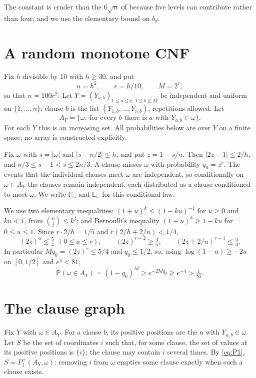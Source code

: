 \documentclass[11pt]{amsart}
\theoremstyle{definition}
\theoremstyle{remark}
\numberwithin{equation}{section}
\newcommand{\Pp}{\mathbb P}
\newcommand{\E}{\mathbb E}
\begin{document}
The constant is cruder than the $6\sqrt n$ of \cite[(53.2)]{C} because five levels can contribute rather than four, and we use the elementary bound on $b_d$.

\section{A random monotone CNF}\label{sec:cnf}

Fix $h$ divisible by $10$ with $h\ge30$, and put
\[
n=h^2,\qquad r=h/10,\qquad M=2^r,
\]
so that $n=100r^2$. Let $Y=(Y_{a,b})_{1\le a\le r,\,1\le b\le M}$ be independent and uniform on $\{1,\dots,n\}$; clause $b$ is the list $(Y_{1,b},\dots,Y_{r,b})$, repetitions allowed. Let
\[
A_Y=\{\omega:\ \text{for every } b \text{ there is } a \text{ with } Y_{a,b}\in\omega\}.
\]
For each $Y$ this is an increasing set. All probabilities below are over $Y$ on a finite space; no array is constructed explicitly.

Fix $\omega$ with $s=|\omega|$ and $|s-n/2|\le h$, and put $z=1-s/n$. Then $|2z-1|\le2/h$, and $n/3\le s-1<s\le2n/3$. A clause misses $\omega$ with probability $q_0=z^r$. The events that the individual clauses meet $\omega$ are independent, so conditionally on $\omega\in A_Y$ the clauses remain independent, each distributed as a clause conditioned to meet $\omega$. We write $\Pp_\omega$ and $\E_\omega$ for this conditional law.

We use two elementary inequalities: $(1+u)^k\le(1-ku)^{-1}$ for $u\ge0$ and $ku<1$, from $\binom kj\le k^j$; and Bernoulli's inequality $(1-u)^k\ge1-ku$ for $0\le u\le1$. Since $r\cdot2/h=1/5$ and $r(2/h+2/n)<1/4$,
\begin{equation}\label{eq:powers}
(2z)^a\le\tfrac54\ \ (0\le a\le r),\qquad (2z)^{r-2}\ge\tfrac45,\qquad (2z+2/n)^{r-1}\le\tfrac43 .
\end{equation}
In particular $Mq_0=(2z)^r\le5/4$ and $q_0\le1/2$, so, using $\log(1-u)\ge-2u$ on $[0,1/2]$ and $e^4<81$,
\begin{equation}\label{eq:inA}
\Pp(\omega\in A_Y)=(1-q_0)^M\ge e^{-2Mq_0}\ge e^{-4}>\tfrac1{81}.
\end{equation}

\section{The clause graph}\label{sec:graph}

Fix $Y$ with $\omega\in A_Y$. For a clause $b$, its positive positions are the $a$ with $Y_{a,b}\in\omega$. Let $S$ be the set of coordinates $i$ such that, for some clause, the set of values at its positive positions is $\{i\}$; the clause may contain $i$ several times. By \eqref{eq:P1}, $S=P_1^+(A_Y,\omega)$: removing $i$ from $\omega$ empties some clause exactly when such a clause exists.
\end{document}
